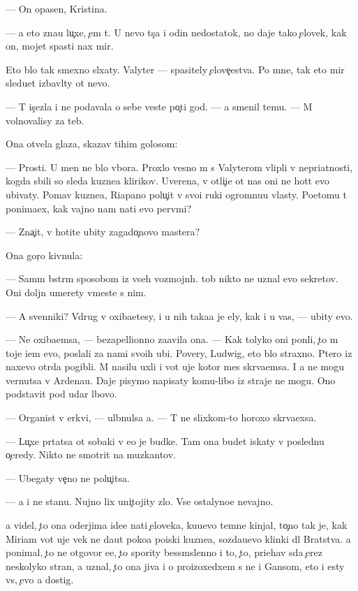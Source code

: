 \documentclass[10pt]{book}
\begin{document}
— On opasen, Kristina.

— {\Y}a eto zna{\y}u lu{\c}xe, {\c}em t{\yi}. U nevo t{\yi}s{\ia}{\c}a i odin nedostatok, no daje tako{\y} {\c}elovek, kak on, mojet spasti nax mir.

Eto b{\yi}lo tak smexno sl{\yi}xaty. Valyter — spasitely {\c}elove{\c}estva. Po mne, tak eto mir sledu{\y}et izbavl{\ia}ty ot nevo.

— T{\yi} is{\c}ezla i ne podavala o sebe veste{\y} po{\c}ti god. — {\Y}a smenil temu. — M{\yi} volnovalisy za teb{\ia}.

Ona otvela glaza, skazav tihim golosom:

— Prosti. U men{\ia} ne b{\yi}lo v{\yi}bora. Proxlo{\y} vesno{\y} m{\yi} s Valyterom vlipli v nepri{\y}atnosti, kogda sbili so sleda kuzne{\q}a klirikov. Uverena, v otli{\c}i{\y}e ot nas oni ne hot{\ia}t {\y}evo ubivaty. Po{\y}mav kuzne{\q}a, Riapano polu{\c}it v svo{\y}i ruki ogromnu{\y}u vlasty. Poetomu t{\yi} ponima{\y}ex, kak vajno nam na{\y}ti {\y}evo perv{\yi}mi?

— Zna{\c}it, v{\yi} hotite ubity zagado{\c}novo mastera?

Ona gor{\ia}{\c}o kivnula:

— Sam{\yi}m b{\yi}str{\yi}m sposobom iz vseh vozmojn{\yi}h. {\C}tob{\yi} nikto ne uznal {\y}evo sekretov. Oni doljn{\yi} umerety vmeste s nim.

— A sv{\ia}{\x}enniki? Vdrug v{\yi} oxiba{\y}etesy, i u nih taka{\y}a je {\q}ely, kak i u vas, — ubity {\y}evo.

— Ne oxiba{\y}emsa, — bezapell{\ia}{\q}ionno za{\y}avila ona. — Kak tolyko oni pon{\ia}li, {\c}to m{\yi} toje i{\x}em {\y}evo, poslali za nami svo{\y}ih ubi{\y}{\q}. Povery, Ludwig, eto b{\yi}lo straxno. P{\ia}tero iz naxevo otr{\ia}da pogibli. M{\yi} nasilu uxli i vot uje kotor{\yi}{\y} mes{\ia}{\q} skr{\yi}va{\y}emsa. I {\y}a ne mogu vernutsa v Ardenau. Daje pisymo napisaty komu-libo iz straje{\y} ne mogu. Ono podstavit pod udar l{\iu}bovo.

— Organist v {\q}erkvi, — ul{\yi}bnulsa {\y}a. — T{\yi} ne slixkom-to horoxo skr{\yi}va{\y}exsa.

— Lu{\c}xe pr{\ia}tatsa ot sobaki v {\y}e{\y}o je budke. Tam ona budet iskaty v posledn{\iu}{\y}u o{\c}eredy. Nikto ne smotrit na muz{\yi}kantov.

— Ubegaty ve{\c}no ne polu{\c}itsa.

— {\Y}a i ne stanu. Nujno lix uni{\c}tojity zlo. Vse ostalyno{\y}e nevajno.

{\Y}a videl, {\c}to ona oderjima ide{\y}e{\y} na{\y}ti {\c}eloveka, ku{\y}u{\x}evo temn{\yi}{\y}e kinjal{\yi}, to{\c}no tak je, kak Miriam vot uje vek ne da{\y}ut poko{\y}a po{\y}iski kuzne{\q}a, sozda{\y}u{\x}evo klinki dl{\ia} Bratstva. {\Y}a ponimal, {\c}to ne otgovor{\iu} {\y}e{\y}e, {\c}to spority bessm{\yi}slenno i to, {\c}to, pri{\y}ehav s{\iu}da {\c}erez neskolyko stran, {\y}a uznal, {\c}to ona jiva i o pro{\y}izoxedxem s ne{\y} i Gansom, eto i {\y}esty vs{\e}, {\c}evo {\y}a dostig.
\end{document}

